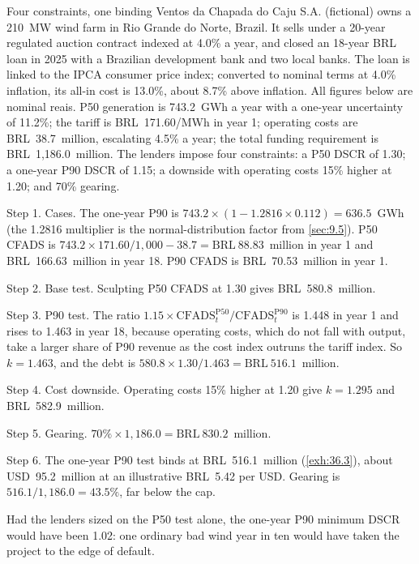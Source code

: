 \begin{example}{Four constraints, one binding \illustrative}\label{ex:36.4}
Ventos da Chapada do Caju S.A. (fictional) owns a 210~MW wind farm in Rio Grande do Norte, Brazil. It sells under a 20-year regulated auction contract indexed at 4.0\% a year, and closed an 18-year BRL loan in 2025 with a Brazilian development bank and two local banks. The loan is linked to the IPCA consumer price index; converted to nominal terms at 4.0\% inflation, its all-in cost is 13.0\%, about 8.7\% above inflation. All figures below are nominal reais. P50 generation is 743.2~GWh a year with a one-year uncertainty of 11.2\%; the tariff is BRL~171.60/MWh in year 1; operating costs are BRL~38.7~million, escalating 4.5\% a year; the total funding requirement is BRL~1,186.0~million. The lenders impose four constraints: a P50 DSCR of 1.30\x; a one-year P90 DSCR of 1.15\x; a downside with operating costs 15\% higher at 1.20\x; and 70\% gearing.

Step 1. Cases. The one-year P90 is $743.2 \times (1 - 1.2816 \times 0.112) = 636.5$~GWh (the 1.2816 multiplier is the normal-distribution factor from \cref{sec:9.5}). P50 CFADS is $743.2 \times 171.60/1{,}000 - 38.7 = \mathrm{BRL}~88.83$~million in year 1 and BRL~166.63~million in year 18. P90 CFADS is BRL~70.53~million in year 1.

Step 2. Base test. Sculpting P50 CFADS at 1.30\x{} gives BRL~580.8~million.

Step 3. P90 test. The ratio $1.15 \times \mathrm{CFADS}^{\mathrm{P50}}_t / \mathrm{CFADS}^{\mathrm{P90}}_t$ is 1.448 in year 1 and rises to 1.463 in year 18, because operating costs, which do not fall with output, take a larger share of P90 revenue as the cost index outruns the tariff index. So $k = 1.463$, and the debt is $580.8 \times 1.30/1.463 = \mathrm{BRL}~516.1$~million.

Step 4. Cost downside. Operating costs 15\% higher at 1.20\x{} give $k = 1.295$ and BRL~582.9~million.

Step 5. Gearing. $70\% \times 1{,}186.0 = \mathrm{BRL}~830.2$~million.

Step 6. The one-year P90 test binds at BRL~516.1~million (\cref{exh:36.3}), about USD~95.2~million at an illustrative BRL~5.42 per USD. Gearing is $516.1/1{,}186.0 = 43.5\%$, far below the cap.

Had the lenders sized on the P50 test alone, the one-year P90 minimum DSCR would have been 1.02\x: one ordinary bad wind year in ten would have taken the project to the edge of default.
\end{example}

